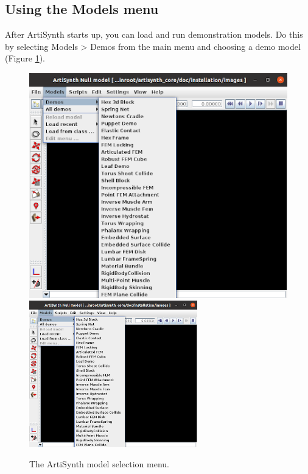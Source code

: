 \fi

\subsection{Using the Models menu}

After ArtiSynth starts up, you can load and run demonstration
models. Do this by selecting {\sf Models > Demos} from the main menu
and choosing a demo model (Figure \ref{ModelSelectionMenu:fig}).

\begin{figure}[ht]
\begin{center}
\iflatexml
   \includegraphics[]{images/ArtiSynthDemoMenu}
\else
   \includegraphics[width=0.65\textwidth]{images/ArtiSynthDemoMenu}
\fi
\end{center}
\caption{The ArtiSynth model selection menu.}
\label{ModelSelectionMenu:fig}
\end{figure}


